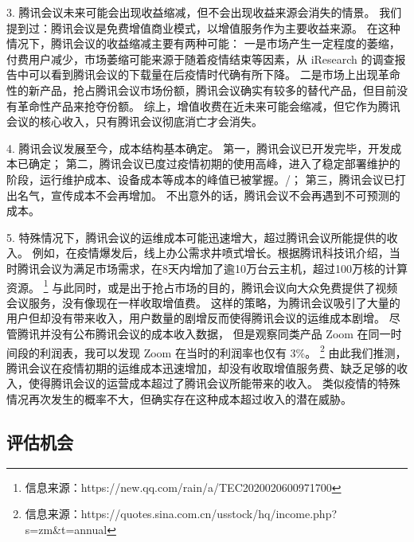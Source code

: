 \documentclass[a4paper,12pt]{article}
\begin{document}
    3.
    腾讯会议未来可能会出现收益缩减，但不会出现收益来源会消失的情景。
    我们提到过：腾讯会议是免费增值商业模式，以增值服务作为主要收益来源。
    在这种情况下，腾讯会议的收益缩减主要有两种可能：
    一是市场产生一定程度的萎缩，付费用户减少，市场萎缩可能来源于随着疫情结束等因素，从 iResearch 的调查报告中可以看到腾讯会议的下载量在后疫情时代确有所下降。
    二是市场上出现革命性的新产品，抢占腾讯会议市场份额，腾讯会议确实有较多的替代产品，但目前没有革命性产品来抢夺份额。
    综上，增值收费在近未来可能会缩减，但它作为腾讯会议的核心收入，只有腾讯会议彻底消亡才会消失。


    4.
    腾讯会议发展至今，成本结构基本确定。
    第一，腾讯会议已开发完毕，开发成本已确定；
    第二，腾讯会议已度过疫情初期的使用高峰，进入了稳定部署维护的阶段，运行维护成本、设备成本等成本的峰值已被掌握。/；
    第三，腾讯会议已打出名气，宣传成本不会再增加。
    不出意外的话，腾讯会议不会再遇到不可预测的成本。

    5.
    特殊情况下，腾讯会议的运维成本可能迅速增大，超过腾讯会议所能提供的收入。
    例如，在疫情爆发后，线上办公需求井喷式增长。根据腾讯科技讯介绍，当时腾讯会议为满足市场需求，在8天内增加了逾10万台云主机，超过100万核的计算资源。
    \footnote{信息来源：https://new.qq.com/rain/a/TEC2020020600971700}
    与此同时，或是出于抢占市场的目的，腾讯会议向大众免费提供了视频会议服务，没有像现在一样收取增值费。
    这样的策略，为腾讯会议吸引了大量的用户但却没有带来收入，用户数量的剧增反而使得腾讯会议的运维成本剧增。
    尽管腾讯并没有公布腾讯会议的成本收入数据， 但是观察同类产品 Zoom 在同一时间段的利润表，我可以发现 Zoom 在当时的利润率也仅有 3\%。
    \footnote{信息来源：https://quotes.sina.com.cn/usstock/hq/income.php?s=zm\&t=annual}
    由此我们推测，腾讯会议在疫情初期的运维成本迅速增加，却没有收取增值服务费、缺乏足够的收入，使得腾讯会议的运营成本超过了腾讯会议所能带来的收入。
    类似疫情的特殊情况再次发生的概率不大，但确实存在这种成本超过收入的潜在威胁。

    \subsection{评估机会}\label{subsec:opportunity}
\end{document}
